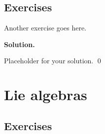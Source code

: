\documentclass[12pt]{book}
\theoremstyle{definition}
\newenvironment{solution}
{%
  \par\noindent\textbf{Solution.}\quad
}
{%
  \qed\par
}
\begin{document}
\section{Exercises}

\begin{taggedexercise}[TODO]
Another exercise goes here.
\end{taggedexercise}

\begin{solution}
Placeholder for your solution.
\end{solution}

\chapter{Lie algebras}
\section{Exercises}

\begin{taggedexercise}[TODO]

\end{taggedexercise}

\begin{taggedexercise}[TODO]

\end{taggedexercise}

\begin{taggedexercise}[TODO]

\end{taggedexercise}

\begin{taggedexercise}[TODO]

\end{taggedexercise}

\begin{taggedexercise}[TODO]

\end{taggedexercise}

\begin{taggedexercise}[TODO]

\end{taggedexercise}

\begin{taggedexercise}[TODO]

\end{taggedexercise}
\end{document}
